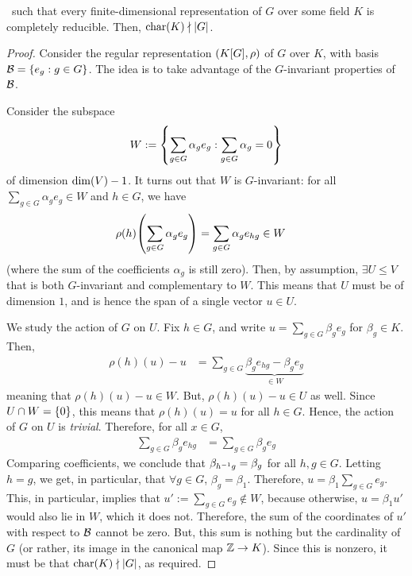 \begin{theorem} \label{Ch1:Thm:Maschke_Converse}
    \ such that every finite-dimensional representation of $G$ over some field $K$ is completely reducible. Then, $\operatorname{char}\!\left( K \right) \nmid \left\lvert G \right\rvert$.
\end{theorem}
\begin{proof}
    Consider the regular representation $\left( K[G], \rho \right)$ of $G$ over $K$, with basis $\mathcal{B} = \left\{ e_g : g \in G \right\}$. The idea is to take advantage of the $G$-invariant properties of $\mathcal{B}$.

    Consider the subspace
    \begin{align*}
        W := \left\{ \sum_{g \in G} \alpha_g e_g : \sum_{g \in G} \alpha_g = 0 \right\}
    \end{align*}
    of dimension $\dim\!\left( V \right) - 1$. It turns out that $W$ is $G$-invariant: for all $\sum_{g \in G} \alpha_g e_g \in W$ and $h \in G$, we have
    \begin{align*}
        \rho(h)\!\left( \sum_{g \in G} \alpha_g e_g \right) &= \sum_{g \in G} \alpha_g e_{hg} \in W
    \end{align*}
    (where the sum of the coefficients $\alpha_g$ is still zero). Then, by assumption, $\exists U \leq V$ that is both $G$-invariant and complementary to $W$. This means that $U$ must be of dimension $1$, and is hence the span of a single vector $u \in U$.

    We study the action of $G$ on $U$. Fix $h \in G$, and write $u = \sum_{g \in G} \beta_g e_g$ for $\beta_g \in K$. Then,
    \begin{align*}
        \rho(h)(u) - u
        &= \sum_{g \in G} \underbrace{\beta_g e_{hg} - \beta_g e_g}_{\in W}
    \end{align*}
    meaning that $\rho(h)(u) - u \in W$. But, $\rho(h)(u) - u \in U$ as well. Since $U \cap W = \left\{ 0 \right\}$, this means that $\rho(h)(u) = u$ for all $h \in G$. Hence, the action of $G$ on $U$ is \textit{trivial}. Therefore, for all $x \in G$,
    \begin{align*}
        \sum_{g \in G} \beta_g e_{hg} &= \sum_{g \in G} \beta_g e_g
    \end{align*}
    Comparing coefficients, we conclude that $\beta_{h^{-1} g} = \beta_g$ for all $h,g \in G$. Letting $h = g$, we get, in particular, that $\forall g \in G$, $\beta_g = \beta_1$. Therefore, $u = \beta_1 \sum_{g \in G} e_g$. This, in particular, implies that $u' := \sum_{g \in G} e_g \notin W$, because otherwise, $u = \beta_1 u'$ would also lie in $W$, which it does not. Therefore, the sum of the coordinates of $u'$ with respect to $\mathcal{B}$ cannot be zero. But, this sum is nothing but the cardinality of $G$ (or rather, its image in the canonical map $\mathbb{Z} \to K$). Since this is nonzero, it must be that $\operatorname{char}\!\left( K \right) \nmid \left\lvert G \right\rvert$, as required.
\end{proof}

